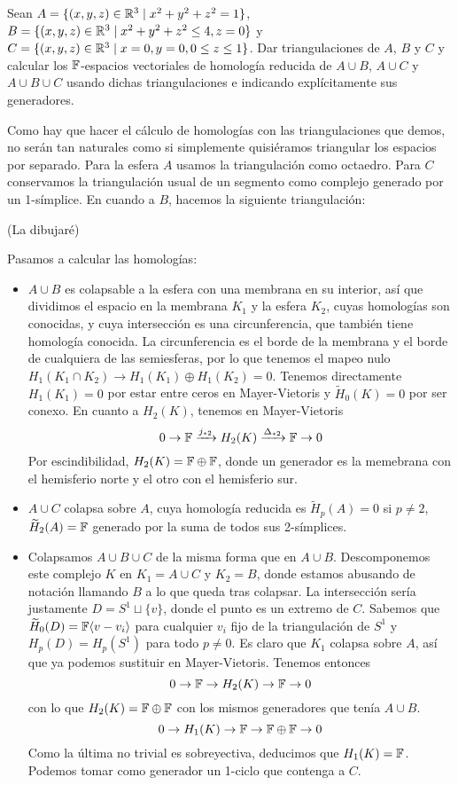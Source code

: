\documentclass[twoside]{article}
\begin{document}
\newpage

\begin{ejercicio}{2}
Sean $A=\{(x,y,z)\in\mathbb{R}^3\mid x^2+y^2+z^2=1\}$, $B=\{(x,y,z)\in\mathbb{R}^3\mid x^2+y^2+z^2\leq 4, z=0\}$ y $C=\{(x,y,z)\in\mathbb{R}^3\mid x=0,y=0, 0\leq z\leq 1\}$. Dar triangulaciones de $A$, $B$ y $C$ y calcular los $\mathbb{F}$-espacios vectoriales de homología reducida de $A\cup B$, $A\cup C$ y $A\cup B\cup C$ usando dichas triangulaciones e indicando explícitamente sus generadores.
\end{ejercicio}
\begin{solucion}
Como hay que hacer el cálculo de homologías con las triangulaciones que demos, no serán tan naturales como si simplemente quisiéramos triangular los espacios por separado. Para la esfera $A$ usamos la triangulación como octaedro.  Para $C$ conservamos la triangulación usual de un segmento como complejo generado por un 1-símplice. En cuando a $B$, hacemos la siguiente triangulación:

(La dibujaré)

Pasamos a calcular las homologías:
\begin{itemize}
\item $A\cup B$ es colapsable a la esfera con una membrana en su interior, así que dividimos el espacio en la membrana $K_1$ y la esfera $K_2$, cuyas homologías son conocidas, y cuya intersección es una circunferencia, que también tiene homología conocida. La circunferencia es el borde de la membrana y el borde de cualquiera de las semiesferas, por lo que tenemos el mapeo nulo $H_1(K_1\cap K_2)\to H_1(K_1)\oplus H_1(K_2)=0$. Tenemos directamente $H_1(K_1)=0$ por estar entre ceros en Mayer-Vietoris y $\widetilde{H}_0(K)=0$ por ser conexo. En cuanto a $H_2(K)$, tenemos en Mayer-Vietoris
\[
0\to\mathbb{F}\xrightarrow{j_{*2}}H_2(K)\xrightarrow{\Delta_{*2}}\mathbb{F}\to 0
\]
Por escindibilidad, $H_2(K)=\mathbb{F}\oplus\mathbb{F}$, donde un generador es la memebrana con el hemisferio norte y el otro con el hemisferio sur.

\item $A\cup C$ colapsa sobre $A$, cuya homología reducida es $\widetilde{H}_p(A)=0$ si $p\neq 2$, $\widetilde{H}_2(A)=\mathbb{F}$ generado por la suma de todos sus 2-símplices.

\item Colapsamos $A\cup B\cup C$ de la misma forma que en $A\cup B$. Descomponemos este complejo $K$ en $K_1=A\cup C$ y $K_2=B$, donde estamos abusando de notación llamando $B$ a lo que queda tras colapsar. La intersección  sería justamente $D=S^1\sqcup\{v\}$, donde el punto es un extremo de $C$. Sabemos que $\widetilde{H}_0(D)=\mathbb{F}\langle{v-v_i}\rangle$ para cualquier $v_i$ fijo de la triangulación de $S^1$ y $H_p(D)=H_p(S^1)$ para todo $p\neq 0$. Es claro que $K_1$ colapsa sobre $A$, así que ya podemos sustituir en Mayer-Vietoris. Tenemos entonces
\[
0\to \mathbb{F}\to H_2(K)\to \mathbb{F}\to 0
\]
con lo que $H_2(K)=\mathbb{F}\oplus\mathbb{F}$ con los mismos generadores que tenía $A\cup B$. 
\[
0\to H_1(K)\to\mathbb{F}\to\mathbb{F}\oplus\mathbb{F}\to 0
\]
Como la última no trivial es sobreyectiva, deducimos que $H_1(K)=\mathbb{F}$. Podemos tomar como generador un 1-ciclo que contenga a $C$. 
\end{itemize}
\end{solucion}
\end{document}
